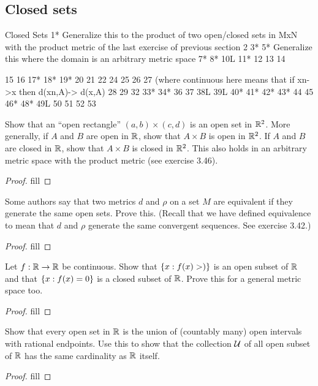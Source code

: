 \subsection{Closed sets}

Closed Sets
1* Generalize this to the product of two open/closed sets in MxN with the product metric of the last exercise of previous section
2
3*
5* Generalize this where the domain is an arbitrary metric space
7*
8*
10L
11*
12
13
14

15
16
17*
18*
19*
20
21
22
24
25
26
27 (where continuous here means that if xn->x then d(xn,A)-> d(x,A)
28
29
32
33*
34*
36
37
38L
39L
40*
41*
42*
43*
44
45
46*
48*
49L
50
51
52
53


\begin{exercise}{1}
Show that an ``open rectangle'' $(a,b)\times (c,d)$ is an open set in $\mathbb{R}^2$. More generally, if $A$ and $B$ are open in $\mathbb{R}$, show that $A\times B$ is open in $\mathbb{R}^2$. If $A$ and $B$ are closed in $\mathbb{R}$, show that $A\times B$ is closed in $\mathbb{R}^2$. This also holds in an arbitrary metric space with the product metric (see exercise 3.46).
\end{exercise}
\begin{proof}
fill
\end{proof} 

\begin{exercise}{3}
Some authors say that two metrics $d$ and $\rho$ on a set $M$ are equivalent if they generate the same open sets. Prove this. (Recall that we have defined equivalence to mean that $d$ and $\rho$ generate the same convergent sequences. See exercise 3.42.)
\end{exercise}
\begin{proof}
fill
\end{proof} 

\begin{exercise}{5}
Let $f:\mathbb{R}\to\mathbb{R}$ be continuous. Show that $\{x:f(x)>)\}$ is an open subset of $\mathbb{R}$ and that $\{x:f(x)=0\}$ is a closed subset of $\mathbb{R}$. Prove this for a general metric space too.
\end{exercise}
\begin{proof}
fill
\end{proof} 

\begin{exercise}{7}
Show that every open set in $\mathbb{R}$ is the union of (countably many) open intervals with rational endpoints. Use this to show that the collection $\mathcal{U}$ of all open subset of $\mathbb{R}$ has the same cardinality as $\mathbb{R}$ itself.
\end{exercise}
\begin{proof}
fill
\end{proof} 

